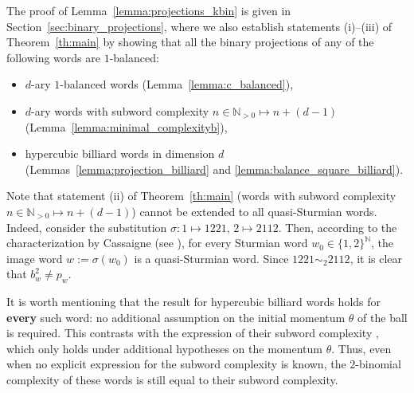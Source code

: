 \documentclass{template_arxiv}
\theoremstyle{definition}
\newcommand{\N}{\mathbb{N}}
\begin{document}
The proof of Lemma~\ref{lemma:projections_kbin} is given in Section~\ref{sec:binary_projections}, where we also establish statements (i)--(iii) of Theorem~\ref{th:main} by showing that all the binary projections of any of the following words are $1$-balanced:
\begin{itemize}
    \vspace{-0.2cm}\item[-] $d$-ary $1$-balanced words (Lemma~\ref{lemma:c_balanced}),
    \vspace{-0.2cm}\item[-] $d$-ary words with subword complexity $n\in\N_{>0}\mapsto n+(d-1)$ (Lemma~\ref{lemma:minimal_complexityb}),
    \vspace{-0.2cm}\item[-] hypercubic billiard words in dimension $d$ (Lemmas~\ref{lemma:projection_billiard} and \ref{lemma:balance_square_billiard}).
\end{itemize}

Note that statement (ii) of Theorem~\ref{th:main} (words with subword complexity $n\in\N_{>0}\mapsto n+(d-1)$) cannot be extended to all quasi-Sturmian words. Indeed, consider the substitution $\sigma:1\mapsto 1221, \, 2\mapsto 2112$. Then, according to the characterization by Cassaigne (see \cite[Proposition~8]{Cas97}), for every Sturmian word $w_0\in\{1,2\}^\N$, the image word $w:=\sigma(w_0)$ is a quasi-Sturmian word. Since $1221\sim_2 2112$, it is clear that $b_w^2\neq p_w$.

It is worth mentioning that the result for hypercubic billiard words holds for \textbf{every} such word: no additional assumption on the initial momentum $\theta$ of the ball is required. This contrasts with the expression of their subword complexity \cite{Bar95,Bed09}, which only holds under additional hypotheses on the momentum $\theta$. Thus, even when no explicit expression for the subword complexity is known, the $2$-binomial complexity of these words is still equal to their subword complexity.

\medskip
\end{document}
